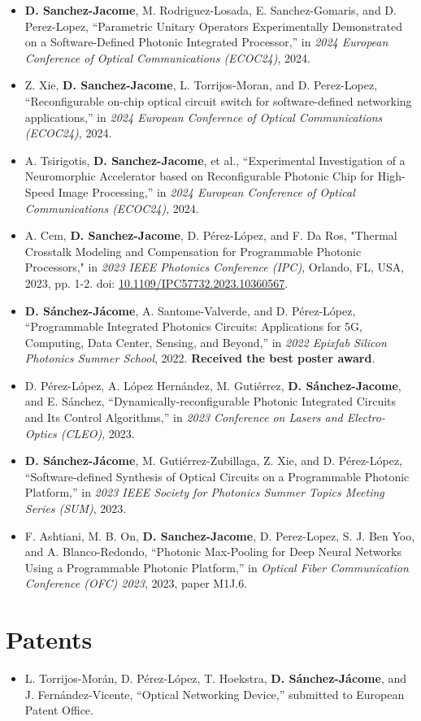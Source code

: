 \begin{itemize}
  \item \textbf{D. Sanchez-Jacome}, M. Rodriguez-Losada, E. Sanchez-Gomaris, and D. Perez-Lopez, “Parametric Unitary Operators Experimentally Demonstrated on a Software-Defined Photonic Integrated Processor,” in \textit{2024 European Conference of Optical Communications (ECOC24)}, 2024.
  \item Z. Xie, \textbf{D. Sanchez-Jacome}, L. Torrijos-Moran, and D. Perez-Lopez, “Reconfigurable on-chip optical circuit switch for software-defined networking applications,” in \textit{2024 European Conference of Optical Communications (ECOC24)}, 2024.
  \item A. Tsirigotis, \textbf{D. Sanchez-Jacome}, et al., “Experimental Investigation of a Neuromorphic Accelerator based on Reconfigurable Photonic Chip for High-Speed Image Processing,” in \textit{2024 European Conference of Optical Communications (ECOC24)}, 2024.
  \item A. Cem, \textbf{D. Sanchez-Jacome}, D. Pérez-López, and F. Da Ros, "Thermal Crosstalk Modeling and Compensation for Programmable Photonic Processors," in \textit{2023 IEEE Photonics Conference (IPC)}, Orlando, FL, USA, 2023, pp. 1-2. doi: \href{https://doi.org/10.1109/IPC57732.2023.10360567}{10.1109/IPC57732.2023.10360567}.
  \item \textbf{D. Sánchez-Jácome}, A. Santome-Valverde, and D. Pérez-López, “Programmable Integrated Photonics Circuits: Applications for 5G, Computing, Data Center, Sensing, and Beyond,” in
    \textit{2022 Epixfab Silicon Photonics Summer School}, 2022. \textbf{Received the best poster award}.
  \item D. Pérez-López, A. López Hernández, M. Gutiérrez, \textbf{D. Sánchez-Jacome}, and E. Sánchez, “Dynamically-reconfigurable Photonic Integrated Circuits and Its Control Algorithms,” in \textit{2023 Conference on Lasers and Electro-Optics (CLEO)}, 2023.
  \item \textbf{D. Sánchez-Jácome}, M. Gutiérrez-Zubillaga, Z. Xie, and D. Pérez-López, “Software-defined Synthesis of Optical Circuits on a Programmable Photonic Platform,” in \textit{2023 IEEE Society for Photonics Summer Topics Meeting Series (SUM)}, 2023.
  \item F. Ashtiani, M. B. On, \textbf{D. Sanchez-Jacome}, D. Perez-Lopez, S. J. Ben Yoo, and A. Blanco-Redondo, “Photonic Max-Pooling for Deep Neural Networks Using a Programmable Photonic Platform,” in \textit{Optical Fiber Communication Conference (OFC) 2023}, 2023, paper M1J.6.
\end{itemize}

\section*{Patents}

\begin{itemize}
  \item L. Torrijos-Morán, D. Pérez-López, T. Hoekstra, \textbf{D. Sánchez-Jácome}, and J. Fernández-Vicente, “Optical Networking Device,” submitted to European Patent Office.
\end{itemize}
